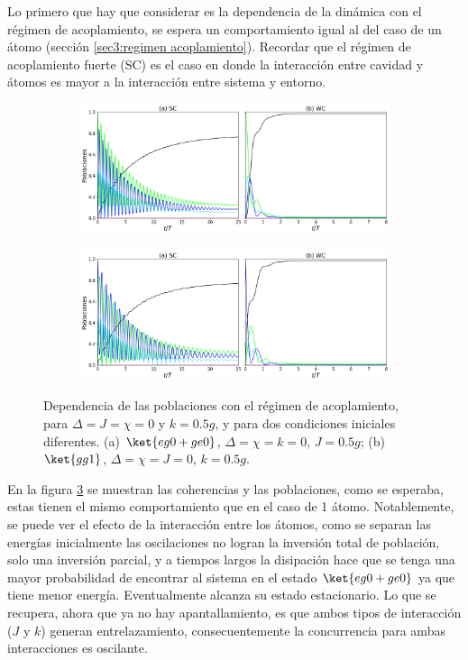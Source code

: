 Lo primero que hay que considerar es la dependencia de la dinámica con el régimen de acoplamiento, se espera un comportamiento igual al del caso de un átomo (sección \ref{sec3:regimen acoplamiento}). Recordar que el régimen de acoplamiento fuerte (SC) es el caso en donde la interacción entre cavidad y átomos es mayor a la interacción entre sistema y entorno.
\begin{figure}[h]
    \centering
    \begin{subfigure}{0.7\textwidth}
        \includegraphics[width=\textwidth]{figuras/ch4/sc vs wc eg0 sim j0.5.png}
        \caption{}
        \label{fig4:acoplamiento eg0 sim}
    \end{subfigure}
    \vfill
    \begin{subfigure}{0.7\textwidth}
        \includegraphics[width=\textwidth]{figuras/ch4/sc vs wc gg1 k=0.5.png}
        \caption{}
        \label{fig4:acoplamiento gg1}
    \end{subfigure}
    \caption{Dependencia de las poblaciones con el régimen de acoplamiento, para $\Delta=J=\chi=0$ y $k=0.5g$, y para dos condiciones iniciales diferentes. (a) $\ket{eg0+ge0}$, $\Delta=\chi=k=0$, $J=0.5g$; (b) $\ket{gg1}$, $\Delta=\chi=J=0$, $k=0.5g$.}
    \label{fig4:regimen acoplamiento}
\end{figure}
En  la figura \ref{fig4:regimen acoplamiento} se muestran las coherencias y las poblaciones, como se esperaba, estas tienen el mismo comportamiento que en el caso de 1 átomo. Notablemente, se puede ver el efecto de la interacción entre los átomos, como se separan las energías inicialmente las oscilaciones no logran la inversión total de población, solo una inversión parcial, y a tiempos largos la disipación hace que se tenga una mayor probabilidad de encontrar al sistema en el estado $\ket{eg0+ge0}$ ya que tiene menor energía. Eventualmente alcanza su estado estacionario. Lo que se recupera, ahora que ya no hay apantallamiento, es que ambos tipos de interacción ($J$ y $k$) generan entrelazamiento, consecuentemente la concurrencia para ambas interacciones es oscilante.

